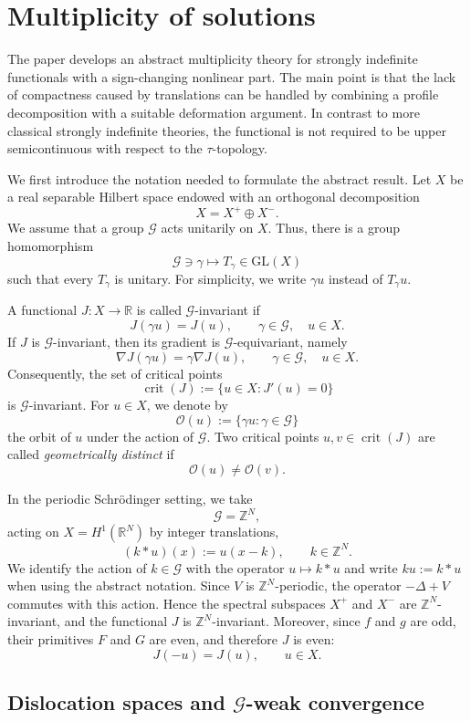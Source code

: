 \documentclass[10pt,a4paper]{amsart}
\numberwithin{equation}{section}
\newcommand{\R}{\mathbb{R}}
\newcommand{\Z}{\mathbb{Z}}
\newcommand{\cG}{\mathcal{G}}
\newcommand{\crit}{\operatorname{crit}}
\begin{document}
\section{Multiplicity of solutions}

The paper \cite{BBS2025} develops an abstract multiplicity theory for
strongly indefinite functionals with a sign-changing nonlinear part. The
main point is that the lack of compactness caused by translations can be
handled by combining a profile decomposition with a suitable deformation
argument. In contrast to more classical strongly indefinite theories, the
functional is not required to be upper semicontinuous with respect to the
$\tau$-topology.

We first introduce the notation needed to formulate the abstract result.
Let $X$ be a real separable Hilbert space endowed with an orthogonal
decomposition
\[
X=X^+\oplus X^-.
\]
We assume that a group $\cG$ acts unitarily on $X$. Thus, there is a group
homomorphism
\[
\cG\ni \gamma\longmapsto T_\gamma\in \mathrm{GL}(X)
\]
such that every $T_\gamma$ is unitary. For simplicity, we write $\gamma u$ instead of
$T_\gamma u$.

A functional $J:X\to\R$ is called $\cG$-invariant if
\[
J(\gamma u)=J(u),
\qquad
\gamma\in\cG,\quad u\in X.
\]
If $J$ is $\cG$-invariant, then its gradient is $\cG$-equivariant, namely
\[
\nabla J(\gamma u)=\gamma\nabla J(u),
\qquad
\gamma\in\cG,\quad u\in X.
\]
Consequently, the set of critical points
\[
\crit(J):=\{u\in X:J'(u)=0\}
\]
is $\cG$-invariant. For $u\in X$, we denote by
\[
\mathcal{O}(u):=\{\gamma u:\gamma\in\cG\}
\]
the orbit of $u$ under the action of $\cG$. Two critical points $u,v\in
\crit(J)$ are called \emph{geometrically distinct} if
\[
\mathcal{O}(u)\neq \mathcal{O}(v).
\]

In the periodic Schr\"odinger setting, we take
\[
\cG=\Z^N,
\]
acting on $X=H^1(\R^N)$ by integer translations,
\[
(k*u)(x):=u(x-k),
\qquad
k\in\Z^N.
\]
We identify the action of $k\in\cG$ with the operator $u\mapsto k*u$ and
write $ku:=k*u$ when using the abstract notation.
Since $V$ is $\Z^N$-periodic, the operator $-\Delta+V$ commutes with this
action. Hence the spectral subspaces $X^+$ and $X^-$ are
$\Z^N$-invariant, and the functional $J$ is $\Z^N$-invariant. Moreover,
since $f$ and $g$ are odd, their primitives $F$ and $G$ are even, and
therefore $J$ is even:
\[
J(-u)=J(u),
\qquad
u\in X.
\]

\subsection{Dislocation spaces and \texorpdfstring{$\cG$}{G}-weak convergence}
\end{document}
